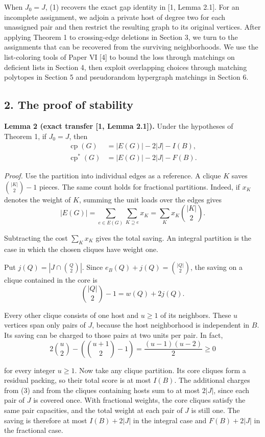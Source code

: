 \documentclass[english,11pt,a4paper]{article}
\begin{document}
When \(J_0=J\), (1) recovers the exact gap identity in {[}1, Lemma 2.1{]}. For an incomplete assignment, we adjoin a private host of degree two for each unassigned pair and then restrict the resulting graph to its original vertices. After applying Theorem 1 to crossing-edge deletions in Section 3, we turn to the assignments that can be recovered from the surviving neighborhoods. We use the list-coloring tools of Paper VI {[}4{]} to bound the loss through matchings on deficient lists in Section 4, then exploit overlapping choices through matching polytopes in Section 5 and pseudorandom hypergraph matchings in Section 6.

\subsection{2. The proof of stability}\label{the-proof-of-stability}

\textbf{Lemma 2 (exact transfer {[}1, Lemma 2.1{]}).} Under the hypotheses of Theorem 1, if \(J_0=J\), then
\[
\begin{aligned}
\operatorname{cp}(G)   &= |E(G)|-2|J|-I(B),\\
\operatorname{cp}^{\ast}(G) &= |E(G)|-2|J|-F(B).
\end{aligned} \tag{2}
\]

\emph{Proof.} Use the partition into individual edges as a reference. A clique \(K\) saves \(\binom{|K|}{2}-1\) pieces. The same count holds for fractional partitions. Indeed, if \(x_K\) denotes the weight of \(K\), summing the unit loads over the edges gives
\[
|E(G)|=\sum_{e\in E(G)}\sum_{K\supseteq e}x_K
       =\sum_K x_K\binom{|K|}{2}.
\]

Subtracting the cost \(\sum_Kx_K\) gives the total saving. An integral partition is the case in which the chosen cliques have weight one.

Put \(j(Q)=|J\cap\binom{Q}{2}|\). Since \(e_B(Q)+j(Q)=\binom{|Q|}{2}\), the saving on a clique contained in the core is
\[
\binom{|Q|}{2}-1=w(Q)+2j(Q). \tag{3}
\]

Every other clique consists of one host and \(u\ge1\) of its neighbors. These \(u\) vertices span only pairs of \(J\), because the host neighborhood is independent in \(B\). Its saving can be charged to those pairs at two units per pair. In fact,
\[
2\binom u2-\left(\binom{u+1}{2}-1\right)
=\frac{(u-1)(u-2)}2\ge0
\]

for every integer \(u\ge1\). Now take any clique partition. Its core cliques form a residual packing, so their total score is at most \(I(B)\). The additional charges from (3) and from the cliques containing hosts sum to at most \(2|J|\), since each pair of \(J\) is covered once. With fractional weights, the core cliques satisfy the same pair capacities, and the total weight at each pair of \(J\) is still one. The saving is therefore at most \(I(B)+2|J|\) in the integral case and \(F(B)+2|J|\) in the fractional case.
\end{document}
